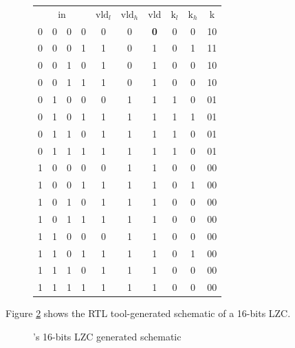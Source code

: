 \begin{figure}[h!]
\begin{minipage}[b]{0.5\linewidth}
        \centering
        \begin{tabular}{cccccccccc}
        \toprule
        \multicolumn{4}{c}{in} & $\text{vld}_l$ & $\text{vld}_h$ & vld & $\text{k}_l$ & $\text{k}_h$ & k \\
        \cmidrule{1-4} %
        0 & 0 & 0 & 0 & 0 & 0 & \textbf{0} & 0 & 0 & 10 \\
        0 & 0 & 0 & 1 & 1 & 0 & 1 & 0 & 1 & 11 \\
        0 & 0 & 1 & 0 & 1 & 0 & 1 & 0 & 0 & 10 \\
        0 & 0 & 1 & 1 & 1 & 0 & 1 & 0 & 0 & 10 \\
        0 & 1 & 0 & 0 & 0 & 1 & 1 & 1 & 0 & 01 \\
        0 & 1 & 0 & 1 & 1 & 1 & 1 & 1 & 1 & 01 \\
        0 & 1 & 1 & 0 & 1 & 1 & 1 & 1 & 0 & 01 \\
        0 & 1 & 1 & 1 & 1 & 1 & 1 & 1 & 0 & 01 \\
        1 & 0 & 0 & 0 & 0 & 1 & 1 & 0 & 0 & 00 \\
        1 & 0 & 0 & 1 & 1 & 1 & 1 & 0 & 1 & 00 \\
        1 & 0 & 1 & 0 & 1 & 1 & 1 & 0 & 0 & 00 \\
        1 & 0 & 1 & 1 & 1 & 1 & 1 & 0 & 0 & 00 \\
        1 & 1 & 0 & 0 & 0 & 1 & 1 & 0 & 0 & 00 \\
        1 & 1 & 0 & 1 & 1 & 1 & 1 & 0 & 1 & 00 \\
        1 & 1 & 1 & 0 & 1 & 1 & 1 & 0 & 0 & 00 \\
        1 & 1 & 1 & 1 & 1 & 1 & 1 & 0 & 0 & 00 \\
        \bottomrule
        \end{tabular}
        \label{table:lod42_truth_table}
    \end{minipage}
\end{figure}

Figure \ref{fig:lzc_synthesized} shows the RTL tool-generated schematic of a 16-bits LZC.


\begin{figure}[h!]
    \noindent{}
    \caption{\cite{PACoGen}'s 16-bits LZC generated schematic}
    \label{fig:lzc_synthesized}
\end{figure}







